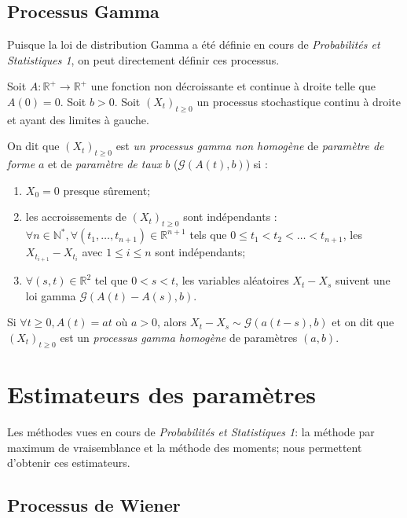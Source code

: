 \documentclass[11pt,a4paper]{article}
\begin{document}
\subsection{Processus Gamma} \label{rappels:gamma}
Puisque la loi de distribution Gamma a été définie en cours de \textit{Probabilités et Statistiques 1}, on peut directement définir ces processus.

Soit $A: \mathbb{R}^{+} \longrightarrow \mathbb{R}^{+}$ une fonction non décroissante et continue à droite telle que $A(0)=0$. Soit $b>0$. Soit $(X_t)_{t \geq 0}$ un processus stochastique continu à droite et ayant des limites à gauche.

On dit que $(X_t)_{t \geq 0}$ est \textit{un processus gamma non homogène} de \textit{paramètre de forme} $a$ et de \textit{paramètre de taux} $b$ ($\mathcal{G}(A(t),b)$) si :
\begin{enumerate}
	\item $X_0=0$ presque sûrement;
	\item les accroissements de $(X_t)_{t \geq 0}$ sont indépendants : $\forall n \in \mathbb{N}^{*}, \forall (t_1, \dots, t_{n+1}) \in \mathbb{R}^{n+1}$ tels que $0 \leq t_1<t_2<\dots<t_{n+1}$, les $X_{t_{i+1}}-X_{t_i}$ avec $1 \leq i \leq n$ sont indépendants;
	\item $\forall (s,t) \in \mathbb{R}^2$ tel que $0<s<t$, les variables aléatoires $X_t-X_s$ suivent une loi gamma $\mathcal{G}(A(t)-A(s),b)$.
\end{enumerate}
Si $\forall t \geq 0, A(t)=at$ où $a>0$, alors $X_t-X_s \sim \mathcal{G}(a(t-s),b)$ et on dit que $(X_t)_{t \geq 0}$ est un \textit{processus gamma homogène} de paramètres $(a,b)$. 


\section{Estimateurs des paramètres} \label{estimateurs}
Les méthodes vues en cours de \textit{Probabilités et Statistiques 1}: la méthode par maximum de vraisemblance et la méthode des moments; nous permettent d'obtenir ces estimateurs.
\subsection{Processus de Wiener} \label{estimateurs:wiener}
\end{document}
